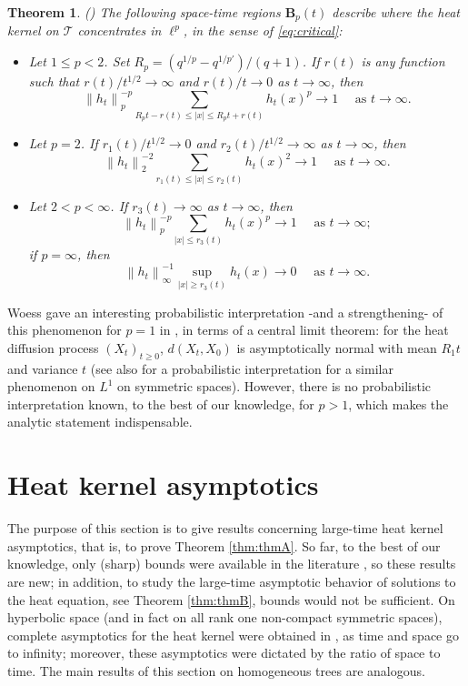 \documentclass[10pt,a4paper]{amsart}
\renewcommand\mathcal{\mathscr}
\theoremstyle{plain}
\newtheorem{theorem}{Theorem}[section]
\theoremstyle{remark}
\theoremstyle{definition}
\begin{document}
	\begin{theorem}(\cite[p.1740]{MedSe}) \label{prop:MedSe_ellp} The following space-time regions $\textbf{B}_p(t)$ describe where the heat kernel on $\mathcal{T}$ concentrates in  $\ell^p$, in the sense of \eqref{eq:critical}:		
	\begin{itemize}
			\item[(i)] Let $1 \leq p<2$. Set $R_p = (q^{1/p} - q^{1/p'})/(q+1)$. If $r(t)$ is any function such that $r(t) / t^{1 / 2} \to\infty$ and $r(t)/t\to 0$ as $t \to\infty$, then
			$$
			\left\|h_t\right\|_p^{-p} \sum_{R_p t-r(t) \leq|x| \leq R_p t+r(t)} h_t(x)^p \to 1 \quad \text { as } t \to\infty .
			$$
			\item[(ii)] Let $p=2$. If $r_1(t) / t^{1 / 2} \to 0$ and $r_2(t) / t^{1 / 2} \to\infty$ as $t \to\infty$, then
			$$
			\left\|h_t\right\|_2^{-2} \sum_{r_1(t) \leq|x| \leq r_2(t)} h_t(x)^2 \to 1 \quad \text { as } t \to\infty .
			$$
			\item[(iii)] Let $2<p<\infty$. If $r_3(t) \to\infty$ as $t \to\infty$, then
			$$
			\left\|h_t\right\|_p^{-p} \sum_{|x| \leq r_3(t)} h_t(x)^p \to 1 \quad \text { as } t \to\infty;
			$$
			if $p=\infty$, then 
			$$
			\left\|h_t\right\|_{\infty}^{-1} \sup _{|x| \geq r_3(t)} h_t(x) \to 0 \quad \text { as } t \to\infty.
			$$
		\end{itemize}
	\end{theorem}
 Woess gave an interesting probabilistic interpretation -and a strengthening- of this phenomenon for $p=1$ in \cite{Woess}, in terms of a central limit theorem: for the heat diffusion process $(X_t)_{t\geq  0}$, $d(X_t, X_0)$ is asymptotically normal with mean $R_1t$ and variance $t$ (see also \cite{Bab} for a probabilistic interpretation for a similar phenomenon on $L^1$ on symmetric spaces). However, there is no probabilistic interpretation known, to the best of our knowledge, for $p>1$, which makes the analytic statement indispensable.
	
	\section{Heat kernel asymptotics}\label{sec:3}
	The purpose of this section is to give results concerning large-time heat kernel asymptotics, that is, to prove Theorem \ref{thm:thmA}. So far, to the best of our knowledge, only (sharp) bounds were available in the literature \cite{CMS}, so these results are new; in addition, to study the large-time asymptotic behavior of solutions to the heat equation, see Theorem \ref{thm:thmB}, bounds would not be sufficient. On hyperbolic space (and in fact on all rank one non-compact symmetric spaces), complete asymptotics for the heat kernel were obtained in \cite[p.1080]{AJ99}, as time and space go to infinity; moreover, these asymptotics were dictated by the ratio of space to time. The main results of this section on homogeneous trees are analogous.
	
\end{document}
